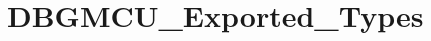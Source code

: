 \hypertarget{group__DBGMCU__Exported__Types}{
\section{DBGMCU\_\-Exported\_\-Types}
\label{group__DBGMCU__Exported__Types}
}
